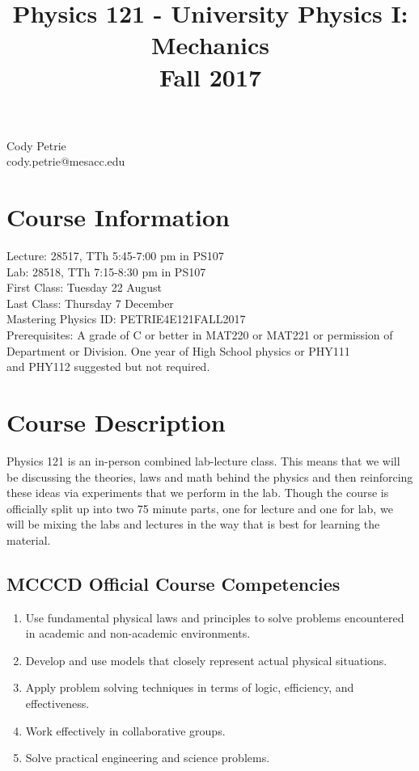 \documentclass[12pt]{article}
\title{Physics 121 - University Physics I: Mechanics \\ Fall 2017 \vspace{-2cm}}
\date{}
\newcommand{\tabc}{4.3cm} %
\begin{document}
\maketitle

\begin{center}
Cody Petrie \\ cody.petrie@mesacc.edu
\end{center}

\section*{Course Information}
Lecture: \tabto{\tabc} 28517, TTh 5:45-7:00 pm in PS107 \\
Lab: \tabto{\tabc} 28518, TTh 7:15-8:30 pm in PS107\\
First Class: \tabto{\tabc} Tuesday 22 August \\
Last Class: \tabto{\tabc} Thursday 7 December \\
Mastering Physics ID: \tabto{\tabc} PETRIE4E121FALL2017 \\
Prerequisites: \tabto{\tabc} A grade of C or better in MAT220 or MAT221 or permission of \\ \tabto{\tabc} Department or Division. One year of High School physics or PHY111 \\ \tabto{\tabc} and PHY112 suggested but not required.

\section*{Course Description}
Physics 121 is an in-person combined lab-lecture class. This means that we will be discussing the theories, laws and math behind the physics and then reinforcing these ideas via experiments that we perform in the lab. Though the course is officially split up into two 75 minute parts, one for lecture and one for lab, we will be mixing the labs and lectures in the way that is best for learning the material.

\subsection*{MCCCD Official Course Competencies}
\begin{enumerate}
   \item Use fundamental physical laws and principles to solve problems encountered in academic and non-academic environments.
   \item Develop and use models that closely represent actual physical situations.
   \item Apply problem solving techniques in terms of logic, efficiency, and effectiveness.
   \item Work effectively in collaborative groups.
   \item Solve practical engineering and science problems.
\end{enumerate}
\end{document}
